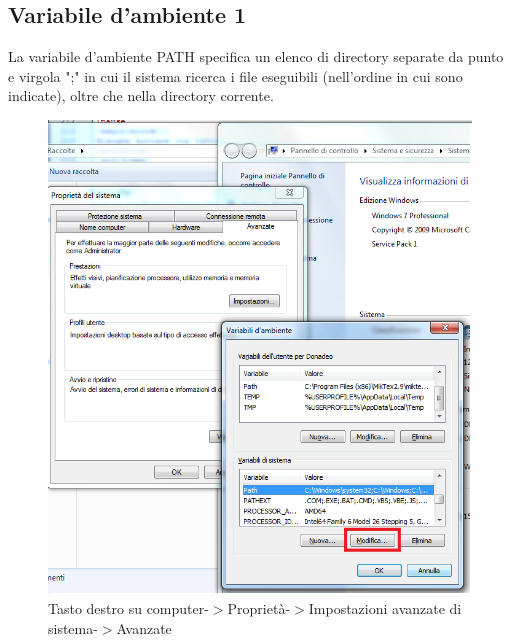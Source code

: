 \subsection*{Variabile d'ambiente 1}
\begin{frame}
La variabile d'ambiente PATH specifica un elenco di directory separate da punto e virgola ";" in cui il sistema ricerca i file eseguibili (nell'ordine in cui sono indicate), oltre che nella directory corrente.
\begin{figure}
\begin{center}
\includegraphics[scale=0.3]{images/path1.png}
\caption{\footnotesize{Tasto destro su computer-$>$Proprietà-$>$Impostazioni avanzate di sistema-$>$Avanzate}}
\end{center}
\end{figure}
\end{frame}

